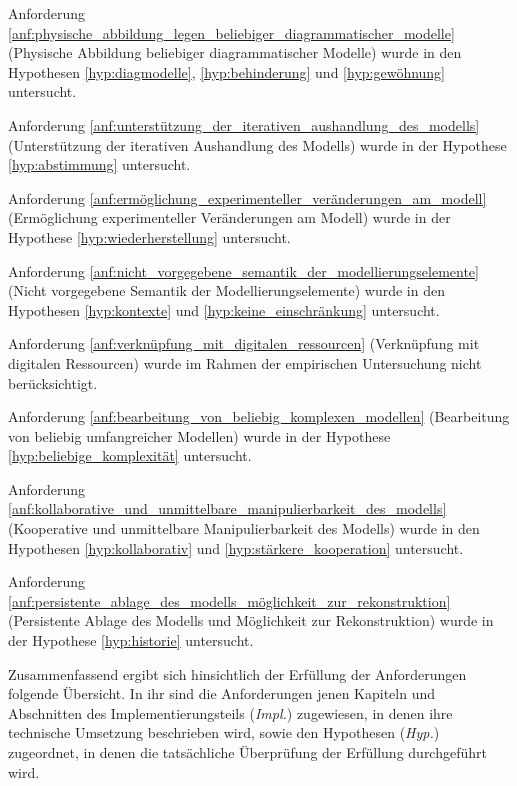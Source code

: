 Anforderung \ref{anf:physische_abbildung_legen_beliebiger_diagrammatischer_modelle} (Physische Abbildung beliebiger diagrammatischer Modelle) wurde in den Hypothesen \ref{hyp:diagmodelle}, \ref{hyp:behinderung} und \ref{hyp:gewöhnung} untersucht.

Anforderung \ref{anf:unterstützung_der_iterativen_aushandlung_des_modells} (Unterstützung der iterativen Aushandlung des Modells) wurde in der Hypothese \ref{hyp:abstimmung} untersucht.

Anforderung \ref{anf:ermöglichung_experimenteller_veränderungen_am_modell} (Ermöglichung experimenteller Veränderungen am Modell) wurde in der Hypothese \ref{hyp:wiederherstellung} untersucht.

Anforderung \ref{anf:nicht_vorgegebene_semantik_der_modellierungselemente} (Nicht vorgegebene Semantik der Modellierungselemente) wurde in den Hypothesen \ref{hyp:kontexte} und \ref{hyp:keine_einschränkung} untersucht.

Anforderung \ref{anf:verknüpfung_mit_digitalen_ressourcen} (Verknüpfung mit digitalen Ressourcen) wurde im Rahmen der empirischen Untersuchung nicht berücksichtigt.

Anforderung \ref{anf:bearbeitung_von_beliebig_komplexen_modellen} (Bearbeitung von beliebig umfangreicher Modellen) wurde in der Hypothese \ref{hyp:beliebige_komplexität} untersucht.

Anforderung \ref{anf:kollaborative_und_unmittelbare_manipulierbarkeit_des_modells} (Kooperative und unmittelbare Manipulierbarkeit des Modells) wurde in den Hypothesen \ref{hyp:kollaborativ} und \ref{hyp:stärkere_kooperation} untersucht.

Anforderung \ref{anf:persistente_ablage_des_modells_möglichkeit_zur_rekonstruktion} (Persistente Ablage des Modells und Möglichkeit zur Rekonstruktion) wurde in der Hypothese \ref{hyp:historie} untersucht.

Zusammenfassend ergibt sich hinsichtlich der Erfüllung der Anforderungen folgende Übersicht. In ihr sind die Anforderungen jenen Kapiteln und Abschnitten des Implementierungsteils (\emph{Impl.}) zugewiesen, in denen ihre technische Umsetzung beschrieben wird, sowie den Hypothesen (\emph{Hyp.}) zugeordnet, in denen die tatsächliche Überprüfung der Erfüllung durchgeführt wird.

